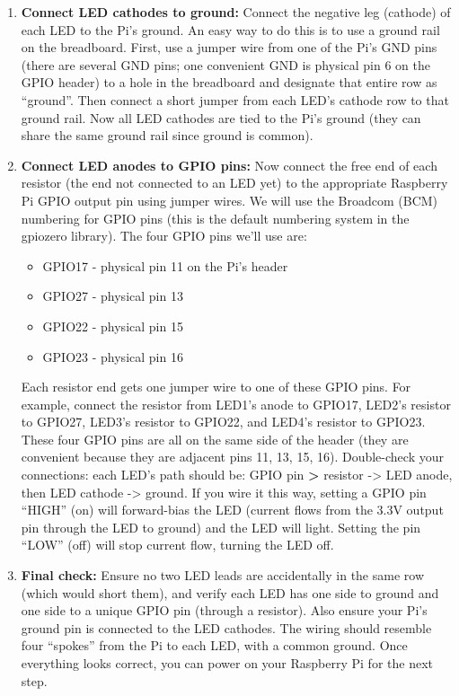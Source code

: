 \documentclass[a4paper,11pt]{article}
\begin{document}
\begin{enumerate}
    \item \textbf{Connect LED cathodes to ground:} Connect the negative leg (cathode) of each 
        LED to the Pi's ground. An easy way to do this is to use a ground rail on the breadboard. 
        First, use a jumper wire from one of the Pi's GND pins 
        (there are several GND pins; one convenient GND is physical pin 6 on the GPIO header) 
        to a hole in the breadboard and designate that entire row as “ground”. 
        Then connect a short jumper from each LED's cathode row to that ground rail. 
        Now all LED cathodes are tied to the Pi's ground (they can share the same ground rail since ground is common).

    \item \textbf{Connect LED anodes to GPIO pins:} Now connect the free end of each resistor 
        (the end not connected to an LED yet) to the appropriate Raspberry Pi GPIO output pin using jumper wires. 
        We will use the Broadcom (BCM) numbering for GPIO pins (this is the default numbering system in the 
        gpiozero library). The four GPIO pins we'll use are:
        \begin{itemize}
            \item GPIO17 - physical pin 11 on the Pi's header
            \item GPIO27 - physical pin 13
            \item GPIO22 - physical pin 15
            \item GPIO23 - physical pin 16
        \end{itemize}

        Each resistor end gets one jumper wire to one of these GPIO pins. 
        For example, connect the resistor from LED1's anode to GPIO17, LED2's 
        resistor to GPIO27, LED3's resistor to GPIO22, and LED4's resistor to GPIO23. 
        These four GPIO pins are all on the same side of the header 
        (they are convenient because they are adjacent pins 11, 13, 15, 16). 
        Double-check your connections: each LED's path should be: GPIO pin \textbf{>} resistor -> LED anode, 
        then LED cathode -> ground. If you wire it this way, setting a GPIO 
        pin “HIGH” (on) will forward-bias the LED (current flows from the 3.3V 
        output pin through the LED to ground) and the LED will light. Setting the 
        pin “LOW” (off) will stop current flow, turning the LED off.

    \item \textbf{Final check:} Ensure no two LED leads are accidentally in the same row 
    (which would short them), and verify each LED has one side to ground and one side to 
    a unique GPIO pin (through a resistor). Also ensure your Pi's ground pin is connected 
    to the LED cathodes. The wiring should resemble four “spokes” from the Pi to each LED, 
    with a common ground. Once everything looks correct, you can power on your Raspberry Pi 
    for the next step.

\end{enumerate}
\end{document}
